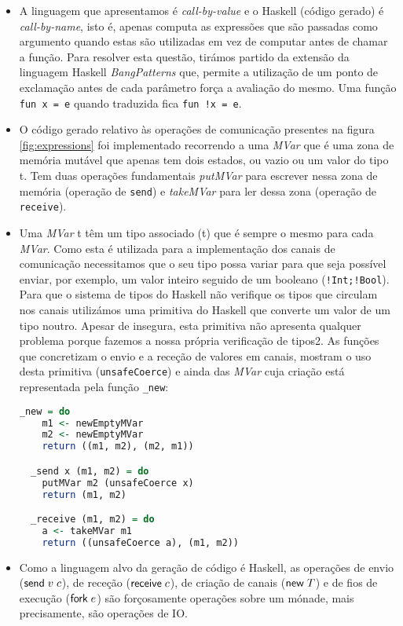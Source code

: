 \begin{itemize}
\item  A linguagem que apresentamos é \textit{call-by-value} e o Haskell (código gerado) é \textit{call-by-name}, isto é, apenas computa as expressões que são passadas como argumento quando estas são utilizadas em vez de computar antes de chamar a função. Para resolver esta questão, tirámos partido da extensão da linguagem Haskell \textit{BangPatterns} que, permite a utilização de um ponto de exclamação antes de cada parâmetro força a avaliação do mesmo. Uma função \lstinline"fun x = e" quando traduzida fica \lstinline"fun !x = e".
\newline
\item O código gerado relativo às operações de comunicação presentes na figura \ref{fig:expressions} foi implementado recorrendo a uma \textit{MVar} que é uma zona de memória mutável que apenas tem dois estados, ou vazio ou um valor do tipo t. Tem duas operações fundamentais \textit{putMVar} para escrever nessa zona de memória (operação de \lstinline"send") e \textit{takeMVar} para ler dessa zona (operação de \lstinline"receive").
\newline
\item Uma \textit{MVar} t têm um tipo associado (t) que é sempre o mesmo para cada \textit{MVar}. Como esta é utilizada para a implementação dos canais de comunicação necessitamos que o seu tipo possa variar para que seja possível enviar, por exemplo, um valor inteiro seguido de um booleano (\lstinline"!Int;!Bool"). Para que o sistema de tipos do Haskell não verifique os tipos que circulam nos canais utilizámos uma primitiva do Haskell que converte um valor de um tipo noutro. Apesar de insegura, esta primitiva não apresenta qualquer problema porque fazemos a nossa própria verificação de tipos2.
  As funções que concretizam o envio e a receção de valores em canais, mostram o uso desta primitiva (\lstinline|unsafeCoerce|) e ainda das \textit{MVar} cuja criação está representada pela função \lstinline|_new|:
\begin{lstlisting}[language=Haskell]
  _new = do
    m1 <- newEmptyMVar
    m2 <- newEmptyMVar
    return ((m1, m2), (m2, m1))

  _send x (m1, m2) = do
    putMVar m2 (unsafeCoerce x)
    return (m1, m2)

  _receive (m1, m2) = do
    a <- takeMVar m1
    return ((unsafeCoerce a), (m1, m2))
\end{lstlisting}

\item Como a linguagem alvo da geração de código é Haskell, as operações de envio ($\mathsf{send}\;v\; c$), de receção ($\mathsf{receive}\;c$), de criação de canais ($\mathsf{new}\;T$) e de fios de execução ($\mathsf{fork}\;e$) são forçosamente operações sobre um mónade, mais precisamente, são operações de IO.


\end{itemize}
